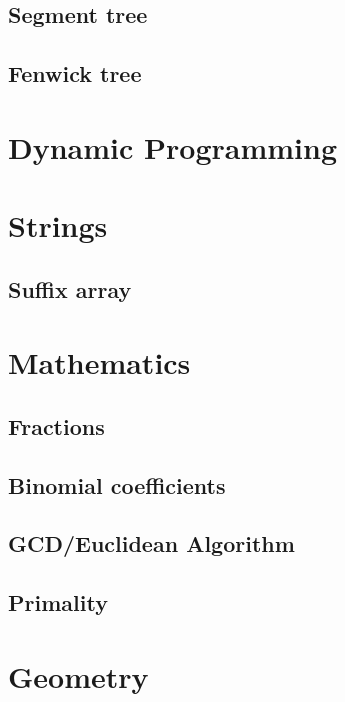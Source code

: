 \documentclass{article}
\newcommand{\code}[1]{\inputminted[fontsize=\normalsize]{java}{code/#1}}
\begin{document}
\code{data-structures/UnionFind.java}

\subsection{Segment tree}

\subsection{Fenwick tree}

\section{Dynamic Programming}

\section{Strings}

\subsection{Suffix array}

\section{Mathematics}

\subsection{Fractions}

\subsection{Binomial coefficients}

\subsection{GCD/Euclidean Algorithm}

\subsection{Primality}

\section{Geometry}
\end{document}
